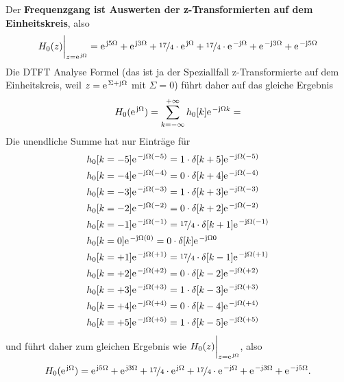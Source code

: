Der \textbf{Frequenzgang ist Auswerten der z-Transformierten auf dem Einheitskreis}, also
\begin{align}
H_0(z)\bigg|_{z=\e^{\im\Omega}}
=
\e^{\im 5 \Omega} + \e^{\im 3 \Omega} + \nicefrac{17}{4}\cdot \e^{\im \Omega}
 + \nicefrac{17}{4}\cdot \e^{-\im\Omega} + \e^{-\im 3 \Omega} + \e^{-\im 5 \Omega}
\end{align}
%
Die DTFT Analyse Formel (das ist ja der Speziallfall
z-Transformierte auf dem Einheitskreis, weil $z=\e^{\Sigma+\im\Omega}$ mit
$\Sigma=0$) führt daher auf das gleiche Ergebnis
\begin{align}
H_0(\e^{\im\Omega}) = \sum_{k=-\infty}^{+\infty} h_0[k] \e^{-\im\Omega k}=
\end{align}
Die unendliche Summe hat nur Einträge für
\begin{align}
&h_0[k=-5] \e^{-\im\Omega (-5)} =  1\cdot\delta[k+5] \e^{-\im\Omega (-5)}\nonumber\\
&h_0[k=-4] \e^{-\im\Omega (-4)} =  0\cdot\delta[k+4] \e^{-\im\Omega (-4)}\nonumber\\
&h_0[k=-3] \e^{-\im\Omega (-3)} =  1\cdot\delta[k+3] \e^{-\im\Omega (-3)}\nonumber\\
&h_0[k=-2] \e^{-\im\Omega (-2)} =  0\cdot\delta[k+2] \e^{-\im\Omega (-2)}\nonumber\\
&h_0[k=-1] \e^{-\im\Omega (-1)} =  \nicefrac{17}{4}\cdot\delta[k+1] \e^{-\im\Omega (-1)}\nonumber\\
&h_0[k=0] \e^{-\im\Omega (0)} =  0\cdot\delta[k] \e^{-\im\Omega 0}\nonumber\\
&h_0[k=+1] \e^{-\im\Omega (+1)} =  \nicefrac{17}{4}\cdot\delta[k-1] \e^{-\im\Omega (+1)}\nonumber\\
&h_0[k=+2] \e^{-\im\Omega (+2)} =  0\cdot\delta[k-2] \e^{-\im\Omega (+2)}\nonumber\\
&h_0[k=+3] \e^{-\im\Omega (+3)} =  1\cdot\delta[k-3] \e^{-\im\Omega (+3)}\nonumber\\
&h_0[k=+4] \e^{-\im\Omega (+4)} =  0\cdot\delta[k-4] \e^{-\im\Omega (+4)}\nonumber\\
&h_0[k=+5] \e^{-\im\Omega (+5)} =  1\cdot\delta[k-5] \e^{-\im\Omega (+5)}
\end{align}
und führt daher zum gleichen Ergebnis wie $H_0(z)\bigg|_{z=\e^{\im\Omega}}$, also
\begin{align}
H_0(\e^{\im\Omega})
=
\e^{\im 5 \Omega} + \e^{\im 3 \Omega} + \nicefrac{17}{4}\cdot \e^{\im \Omega}
 + \nicefrac{17}{4}\cdot \e^{-\im\Omega} + \e^{-\im 3 \Omega} + \e^{-\im 5 \Omega}.
\end{align}
